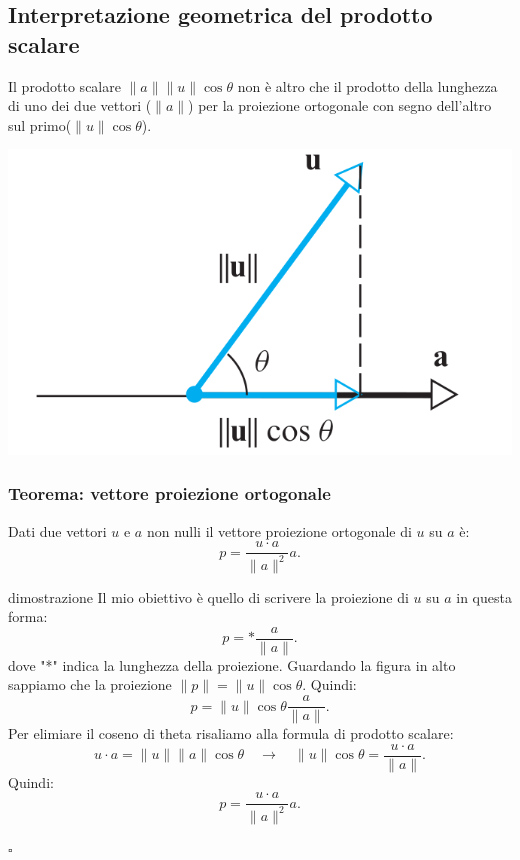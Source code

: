 \documentclass[x11names]{article}
\newcommand*{\QEDB}{\null\nobreak\hfill\ensuremath{\square}}%
\begin{document}
\subsection{Interpretazione geometrica del prodotto scalare}
Il prodotto scalare $\|a\|\|u\|\cos{\theta}$ non è altro che il prodotto della lunghezza di uno dei due vettori ($\|a\|$) per la proiezione ortogonale con segno dell'altro sul primo($\|u\|\cos{\theta}$).

\begin{center}
\includegraphics[scale=0.25]{figures/proj.png}
\end{center}


\begin{center}
	\colorbox{myred}{\begin{minipage}{5.75in}
			\begin{redes}{}
			\subsubsection{Teorema: vettore proiezione ortogonale}
			Dati due vettori $u$ e $a$ non nulli il vettore proiezione ortogonale di $u$ su $a$ è:
			\[
			p = \frac{u\cdot a}{\|a\|^2}a
			.\] 	
			\end{redes}
	\end{minipage}}        
\end{center}



\begin{es}{dimostrazione}
Il mio obiettivo è quello di scrivere la proiezione di $u$ su $a$ in questa forma:
\[
p = * \frac{a}{\|a\|}
.\] 
dove "*" indica la lunghezza della proiezione.
Guardando la figura in alto sappiamo che la proiezione $\|p\| = \|u\|\cos{\theta}$. Quindi:
\[
p = \|u\|\cos{\theta} \frac{a}{\|a\|} 
.\] 
Per elimiare il coseno di theta risaliamo alla formula di prodotto scalare:
\[
u \cdot a = \|u\|\|a\|\cos{\theta} \quad \longrightarrow \quad \|u\|\cos{\theta} = \frac{u\cdot a}{\|a\|}
.\] 
Quindi:
\[
p = \frac{u\cdot a}{\|a\|^2}a
.\] 

\QEDB
\end{es}
\end{document}
